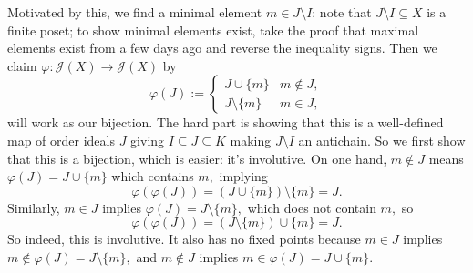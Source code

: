 Motivated by this, we find a minimal element $m\in J\setminus I$: note that $J\setminus I\subseteq X$ is a finite poset; to show minimal elements exist, take the proof that maximal elements exist from a few days ago and reverse the inequality signs. Then we claim $\varphi:\mathcal J(X)\to\mathcal J(X)$ by
\[\varphi(J):=\begin{cases}
    J\cup\{m\} & m\notin J, \\
    J\setminus\{m\} & m\in J,
\end{cases}\]
will work as our bijection. The hard part is showing that this is a well-defined map of order ideals $J$ giving $I\subseteq J\subseteq K$ making $J\setminus I$ an antichain. So we first show that this is a bijection, which is easier: it's involutive. On one hand, $m\notin J$ means $\varphi(J)=J\cup\{m\}$ which contains $m,$ implying 
\[\varphi(\varphi(J))=(J\cup\{m\})\setminus\{m\}=J.\]
Similarly, $m\in J$ implies $\varphi(J)=J\setminus\{m\},$ which does not contain $m,$ so
\[\varphi(\varphi(J))=(J\setminus\{m\})\cup\{m\}=J.\]
So indeed, this is involutive. It also has no fixed points because $m\in J$ implies $m\notin\varphi(J)=J\setminus\{m\},$ and $m\notin J$ implies $m\in\varphi(J)=J\cup\{m\}.$

